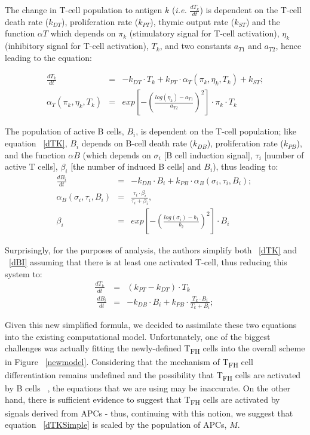 \documentclass[a4paper, 12pt]{report}
\begin{document}
The change in T-cell population to antigen $k$ (\emph{i.e.} $\frac{dT_k}{dt}$) is dependent on the T-cell death rate ($k_{DT}$), proliferation rate ($k_{PT}$), thymic output rate ($k_{ST}$) and the function $\alpha{T}$ which depends on $\pi_{k}$ (stimulatory signal for T-cell activation), $\eta_{k}$ (inhibitory signal for T-cell activation), $T_{k}$, and two constants $a_{T1}$ and $a_{T2}$, hence leading to the equation:

\begin{eqnarray}
\frac{dT_k}{dt} &=& -k_{DT} \cdot T_k + k_{PT} \cdot \alpha_{T}(\pi_{k}, \eta_{k}, T_{k}) + k_{ST}; \label{dTK} \\
\alpha_{T}(\pi_{k}, \eta_{k}, T_{k}) &=& exp\left[-\left(\frac{log(\eta_{k}) - a_{T1}}{a_{T2}}\right)^{2}\right] \cdot \pi_{k} \cdot T_{k}
\end{eqnarray}

The population of active B cells, $B_{i}$, is dependent on the T-cell population; like equation ~\ref{dTK}, $B_{i}$ depends on B-cell death rate ($k_{DB}$), proliferation rate ($k_{PB}$), and the function $\alpha{B}$ (which depends on $\sigma_{i}$ [B cell induction signal], $\tau_{i}$ [number of active T cells], $\beta_{i}$ [the number of induced B cells] and $B_{i}$), thus leading to:
\begin{eqnarray}
\frac{dB_i}{dt} &=& -k_{DB} \cdot B_i + k_{PB} \cdot \alpha_{B}(\sigma_{i}, \tau_{i}, B_{i}); ~\label{dBI} \\
\alpha_{B}(\sigma_{i}, \tau_{i}, B_{i}) &=& \frac{\tau_{i}\cdot{\beta_{i}}}{\tau_{i} + \beta_{i}}, \\
\beta_{i} &=&  exp\left[-\left(\frac{log(\sigma_{i}) - b_{1}}{b_{2}}\right)^{2}\right] \cdot B_{i}
\end{eqnarray}

Surprisingly, for the purposes of analysis, the authors simplify both ~\ref{dTK} and ~\ref{dBI} assuming that there is at least one activated T-cell, thus reducing this system to:
\begin{eqnarray}
\frac{dT_k}{dt} &=& (k_{PT}-k_{DT}) \cdot T_k \\ ~\label{dTKSimple}
\frac{dB_i}{dt} &=& -k_{DB} \cdot B_i + k_{PB} \cdot \frac{T_{k} \cdot B_{i}}{T_{k}+B_{i}}; ~\label{dBISimple}
\end{eqnarray}

Given this new simplified formula, we decided to assimilate these two equations into the existing computational model. Unfortunately, one of the biggest challenges was actually fitting the newly-defined T\textsubscript{FH} cells into the overall scheme in Figure ~\ref{newmodel}. Considering that the mechanism of T\textsubscript{FH} cell differentiation remains undefined and the possibility that T\textsubscript{FH} cells are activated by B cells ~\cite{Crotty}, the equations that we are using may be inaccurate. On the other hand, there is sufficient evidence to suggest that T\textsubscript{FH} cells are activated by signals derived from APCs - thus, continuing with this notion, we suggest that equation ~\ref{dTKSimple} is scaled by the population of APCs, $M$.
\end{document}
